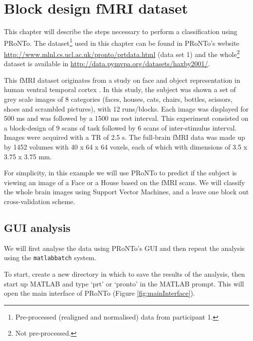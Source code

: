
\chapter{Block design fMRI dataset}
\label{sec:Block_design_fMRI_dataset}
\minitoc

This chapter will describe the steps necessary to perform a classification using PRoNTo. The dataset\footnote{Pre-processed (realigned and normalised) data from participant 1.} used in this chapter can be found in PRoNTo's website \url{http://www.mlnl.cs.ucl.ac.uk/pronto/prtdata.html} (data set 1) and the whole\footnote{Not pre-processed.} dataset is available in \url{http://data.pymvpa.org/datasets/haxby2001/}.

This fMRI dataset originates from a study on face and object representation in human ventral temporal cortex \cite{Haxby2001}. In this study, the subject was shown a set of grey scale images of 8 categories (faces, houses, cats, chairs, bottles, scissors, shoes and scrambled pictures), with 12 runs/blocks. Each image was displayed for 500 ms and was followed by a 1500 ms rest interval. This experiment consisted on a block-design of 9 scans of task followed by 6 scans of inter-stimulus interval. Images were acquired with a TR of 2.5 s. The full-brain fMRI data was made up by 1452 volumes with 40 x 64 x 64 voxels, each of which with dimensions of 3.5 x 3.75 x 3.75 mm.

For simplicity, in this example we will use PRoNTo to predict if the subject is viewing an image of a Face or a House based on the fMRI scans. We will classify the whole brain images using Support Vector Machines, and a leave one block out cross-validation scheme.

\section{GUI analysis}

We will first analyse the data using PRoNTo's GUI and then repeat the analysis using the {\tt matlabbatch} system.

To start, create a new directory in which to save the results of the analysis, then start up MATLAB and type `prt' or `pronto' in the MATLAB prompt. This will open the main interface of PRoNTo (Figure \ref{fig:mainInterface}).

